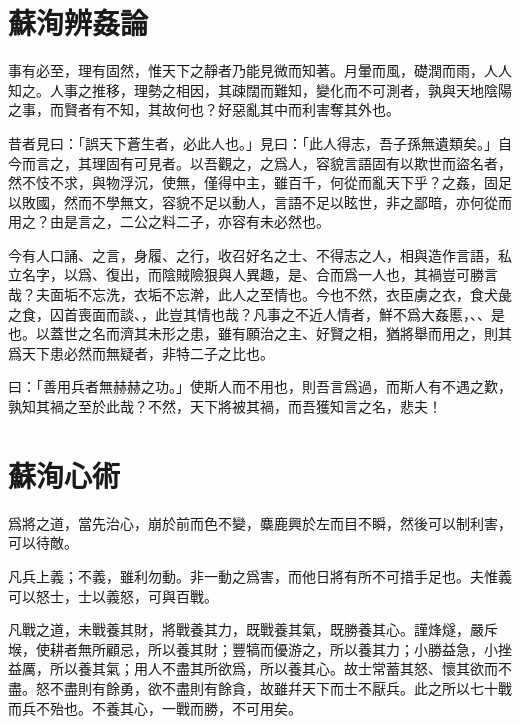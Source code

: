 \section[辨姦論\quad{\small 蘇洵}]{{\normalsize 蘇洵}\quad 辨姦論}
事有必至，理有固然，惟天下之靜者乃能見微而知著。月暈而風，礎潤而雨，人人知之。人事之推移，理勢之相因，其疎闊而難知，變化而不可測者，孰與天地陰陽之事，而賢者有不知，其故何也？好惡亂其中而利害奪其外也。

昔者見曰：「誤天下蒼生者，必此人也。」見曰：「此人得志，吾子孫無遺類矣。」自今而言之，其理固有可見者。以吾觀之，之爲人，容貌言語固有以欺世而盜名者，然不忮不求，與物浮沉，使無，僅得中主，雖百千，何從而亂天下乎？之姦，固足以敗國，然而不學無文，容貌不足以動人，言語不足以眩世，非之鄙暗，亦何從而用之？由是言之，二公之料二子，亦容有未必然也。

今有人口誦、之言，身履、之行，收召好名之士、不得志之人，相與造作言語，私立名字，以爲、復出，而陰賊險狠與人異趣，是、合而爲一人也，其禍豈可勝言哉？夫面垢不忘洗，衣垢不忘澣，此人之至情也。今也不然，衣臣虜之衣，食犬彘之食，囚首喪面而談、，此豈其情也哉？凡事之不近人情者，鮮不爲大姦慝，、、是也。以蓋世之名而濟其未形之患，雖有願治之主、好賢之相，猶將舉而用之，則其爲天下患必然而無疑者，非特二子之比也。

曰：「善用兵者無赫赫之功。」使斯人而不用也，則吾言爲過，而斯人有不遇之歎，孰知其禍之至於此哉？不然，天下將被其禍，而吾獲知言之名，悲夫！
\nopagebreak
\theendnotes

\section[心術\quad{\small 蘇洵}]{{\normalsize 蘇洵}\quad 心術}
爲將之道，當先治心，崩於前而色不變，麋鹿興於左而目不瞬，然後可以制利害，可以待敵。

凡兵上義；不義，雖利勿動。非一動之爲害，而他日將有所不可措手足也。夫惟義可以怒士，士以義怒，可與百戰。

凡戰之道，未戰養其財，將戰養其力，既戰養其氣，既勝養其心。謹烽燧，嚴斥堠，使耕者無所顧忌，所以養其財；豐犒而優游之，所以養其力；小勝益急，小挫益厲，所以養其氣；用人不盡其所欲爲，所以養其心。故士常蓄其怒、懷其欲而不盡。怒不盡則有餘勇，欲不盡則有餘貪，故雖幷天下而士不厭兵。此之所以七十戰而兵不殆也。不養其心，一戰而勝，不可用矣。

